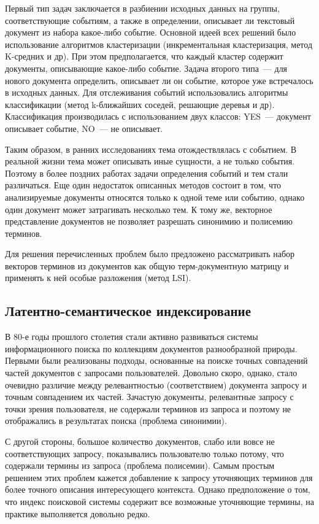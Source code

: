 Первый тип задач заключается в разбиении исходных данных на группы, соответствующие событиям, а также в определении, описывает ли текстовый документ из набора какое-либо событие. Основной идеей всех решений было использование алгоритмов кластеризации (инкрементальная кластеризация, метод K-средних и др). При этом предполагается, что каждый кластер содержит документы, описывающие какое-либо событие. Задача второго типа~--- для нового документа определить, описывает ли он событие, которое уже встречалось в исходных данных. Для отслеживания событий использовались алгоритмы классификации (метод k-ближайших соседей, решающие деревья и др). Классификация производилась с использованием двух классов: YES~--- документ описывает событие, NO~--- не описывает.
 
Таким образом, в ранних исследованиях тема отождествлялась с событием. В реальной жизни тема может описывать иные сущности, а не только события. Поэтому в более поздних работах задачи определения событий и тем стали различаться. Еще один недостаток описанных методов состоит в том, что анализируемые документы относятся только к одной теме или событию, однако один документ может затрагивать несколько тем. К тому же, векторное представление документов не позволяет разрешать синонимию и полисемию терминов. 

Для решения перечисленных проблем было предложено рассматривать набор векторов терминов из документов как общую терм-документную матрицу и применять к ней особые разложения (метод LSI).


\subsection{Латентно-семантическое индексирование}

В 80-е годы прошлого столетия стали активно развиваться системы информационного поиска по коллекциям документов разнообразной природы. Первыми были реализованы подходы, основанные на поиске точных совпадений частей документов с запросами пользователей. Довольно скоро, однако, стало очевидно различие между релевантностью (соответствием) документа запросу и точным совпадением их частей. Зачастую документы, релевантные запросу с точки зрения пользователя, не содержали терминов из запроса и поэтому не отображались в результатах поиска (проблема синонимии). 

С другой стороны, большое количество документов, слабо или вовсе не соответствующих запросу, показывались пользователю только потому, что содержали термины из запроса (проблема полисемии). Самым простым решением этих проблем кажется добавление к запросу уточняющих терминов для более точного описания интересующего контекста. Однако предположение о том, что индекс поисковой системы содержит все возможные уточняющие термины, на практике выполняется довольно редко. 

